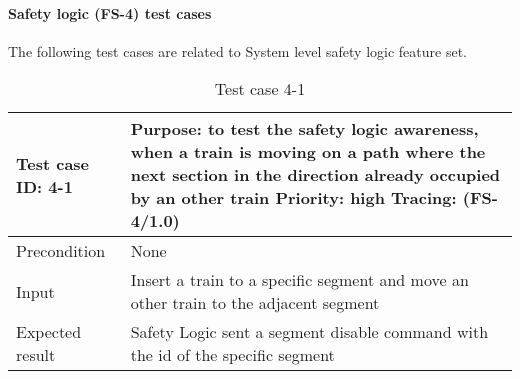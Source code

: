 \paragraph{Safety logic (FS-4) test cases} The following test cases are related to System level safety logic feature set.
\begin{table}[H]
	\caption{Test case 4-1}
	\label{table:TCase-FS4-01}
	\begin{center}
		\renewcommand{\arraystretch}{1.8}
		\begin{tabu} 
			to 0.9 \textwidth
			{  X[0.4, c] X[c] }
			\toprule
			Test case ID: 4-1 & Purpose: to test the safety logic awareness, when a train is moving on a path where the next section in the direction already occupied by an other train \newline Priority: high \newline Tracing: (FS-4/1.0) \\ \midrule
			Precondition      & None                                                                                                                                                                                                          \\
			Input             & Insert a train to a specific segment and move an other train to the adjacent segment                                                                                                                          \\
			Expected result   & Safety Logic sent a segment disable command with the id of the specific segment                                                                                                                               \\ \bottomrule
		\end{tabu}
	\end{center}
\end{table} 

